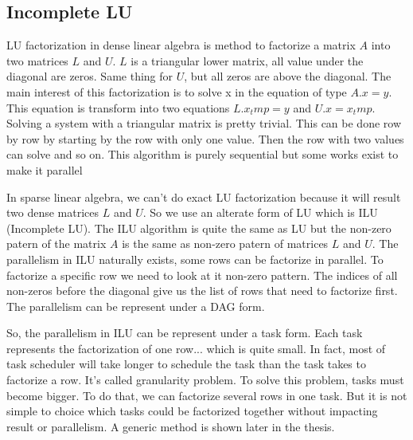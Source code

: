 \subsection{Incomplete LU}
LU factorization in dense linear algebra is method to factorize a matrix $A$ into two matrices $L$ and $U$.
%
$L$ is a triangular lower matrix, all value under the diagonal are zeros.
%
Same thing for $U$, but all zeros are above the diagonal.
%
The main interest of this factorization is to solve x in the equation of type $A.x=y$.
%
This equation is transform into two equations $L.x_tmp=y$ and $U.x=x_tmp$.
%
Solving a system with a triangular matrix is pretty trivial.
%
This can be done row by row by starting by the row with only one value.
%
Then the row with two values can solve and so on.
%
This algorithm is purely sequential but some works exist to make it parallel %

In sparse linear algebra, we can't do exact LU factorization because it will result two dense matrices $L$ and $U$.
%
So we use an alterate form of LU which is ILU (Incomplete LU).
%
The ILU algorithm is quite the same as LU but the non-zero patern of the matrix $A$ is the same as non-zero patern of matrices $L$ and $U$.
%
The parallelism in ILU naturally exists, some rows can be factorize in parallel.
%
To factorize a specific row we need to look at it non-zero pattern.
%
The indices of all non-zeros before the diagonal give us the list of rows that need to factorize first. %
%
The parallelism can be represent under a DAG form. %

So, the parallelism in ILU can be represent under a task form.
%
Each task represents the factorization of one row... which is quite small.
%
In fact, most of task scheduler will take longer to schedule the task than the task takes to factorize a row.
%
It's called granularity problem.
%
To solve this problem, tasks must become bigger.
%
To do that, we can factorize several rows in one task.
%
But it is not simple to choice which tasks could be factorized together without impacting result or parallelism.
%
A generic method is shown later in the thesis.
